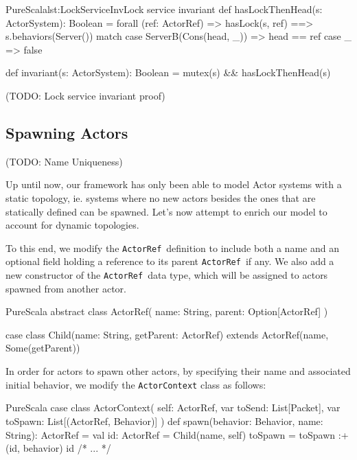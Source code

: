 \documentclass[a4paper,twoside]{article}
\newcommand{\InlineS}[1]{\lstinline[language=PureScala,basicstyle=\small\ttfamily,columns=fixed]|#1|}
\newcommand{\TODO}[1]{\textcolor{YellowOrange}{(TODO: #1)}} %
\newcommand{\ActorRef}{\InlineS{ActorRef}\ }
\newcommand{\stt}[1]{\texttt{\small{#1}}}
\begin{document}
\begin{enumerate}
\begin{Code}{PureScala}{lst:LockServiceInv}{Lock service invariant}
def hasLockThenHead(s: ActorSystem): Boolean = forall { (ref: ActorRef) =>
  hasLock(s, ref) ==> {
    s.behaviors(Server()) match {
      case ServerB(Cons(head, _)) => head == ref
      case _ => false
    }
  }
}

def invariant(s: ActorSystem): Boolean = {
  mutex(s) && hasLockThenHead(s)
}
\end{Code}

\TODO{Lock service invariant proof}

%

%

\subsection{Spawning Actors}
\label{spawn}

\TODO{Name Uniqueness}

Up until now, our framework has only been able to model Actor systems with a static topology, ie. systems where no new actors besides the ones that are statically defined can be spawned. Let's now attempt to enrich our model to account for dynamic topologies.

To this end, we modify the \ActorRef definition to include both a name and an optional field holding a reference to its parent \ActorRef if any. We also add a new constructor of the \ActorRef data type, which will be assigned to actors spawned from another actor.

\begin{ShortCode}{PureScala}
abstract class ActorRef(
  name: String,
  parent: Option[ActorRef]
)

case class Child(name: String, getParent: ActorRef)
  extends ActorRef(name, Some(getParent))
\end{ShortCode}

In order for actors to spawn other actors, by specifying their name and associated 
initial behavior, we modify the \stt{ActorContext} class as follows:

\begin{ShortCode}{PureScala}
case class ActorContext(
  self: ActorRef,
  var toSend: List[Packet],
  var toSpawn: List[(ActorRef, Behavior)]
) {
  def spawn(behavior: Behavior, name: String): ActorRef = {
    val id: ActorRef = Child(name, self)
    toSpawn = toSpawn :+ (id, behavior)
    id
  }
  /* ... */
}
\end{ShortCode}


\end{enumerate}
\end{document}
